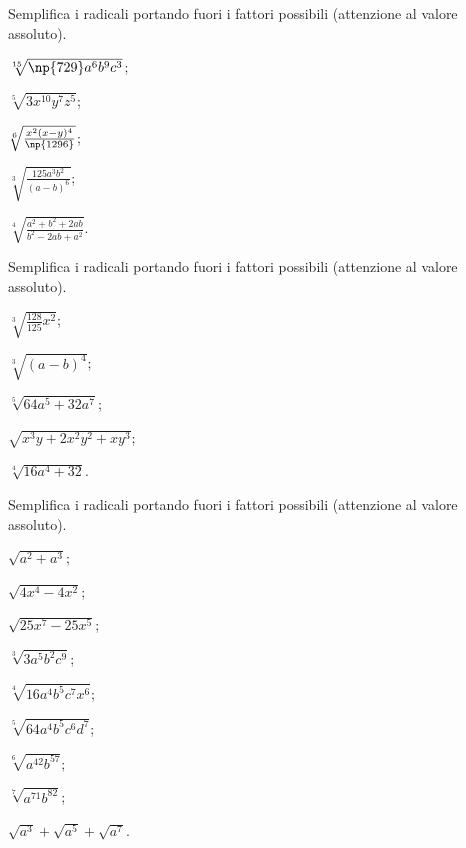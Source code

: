 \begin{esercizio}[\Ast]
 \label{ese:2.55}
Semplifica i radicali portando fuori i fattori possibili (attenzione al valore assoluto).
 \begin{multicols}{3}
 \begin{enumeratea}
 \item $\sqrt[15]{\np{729}a^{6}b^{9}c^{3}}$;
 \item $\sqrt[5]{3x^{10}y^{7}z^{5}}$;
 \item $\sqrt[6]{\frac{x^{2}(x-y)^{4}}{\np{1296}}}$;
 \item $\sqrt[3]{\frac{125a^{3}b^{2}}{(a-b)^6}}$;
 \item $\sqrt[4]{\frac{a^{2}+b^{2}+2ab}{b^{2}-2ab+a^{2}}}$.
 \end{enumeratea}
 \end{multicols}
\end{esercizio}
\pagebreak
\begin{esercizio}[\Ast]
 \label{ese:2.56}
Semplifica i radicali portando fuori i fattori possibili (attenzione al valore assoluto).
 \begin{multicols}{3}
 \begin{enumeratea}
 \item $\sqrt[3]{\frac{128}{125}x^{2}}$;
 \item $\sqrt[3]{(a-b)^{4}}$;
 \item $\sqrt[5]{64a^{5}+32a^{7}}$;
 \item $\sqrt{x^{3}y+2x^{2}y^{2}+xy^{3}}$;
 \item $\sqrt[4]{16a^{4}+32}$.
 \end{enumeratea}
 \end{multicols}
\end{esercizio}

\begin{esercizio}[\Ast]
 \label{ese:2.57}
Semplifica i radicali portando fuori i fattori possibili (attenzione al valore assoluto).
 \begin{multicols}{3}
 \begin{enumeratea}
 \item $\sqrt{a^2+a^3}$;
 \item $\sqrt{4x^4-4x^2}$;
 \item $\sqrt{25x^7-25x^5}$;
 \item $\sqrt[3]{3a^5b^2c^9}$;
 \item $\sqrt[4]{16a^4b^5c^7x^6}$;
 \item $\sqrt[5]{64a^4b^5c^6d^7}$;
 \item $\sqrt[6]{a^{42}b^{57}}$;
 \item $\sqrt[7]{a^{71}b^{82}}$;
 \item $\sqrt{a^3}+\sqrt{a^5}+\sqrt{a^7}$.
 \end{enumeratea}
 \end{multicols}
\end{esercizio}

